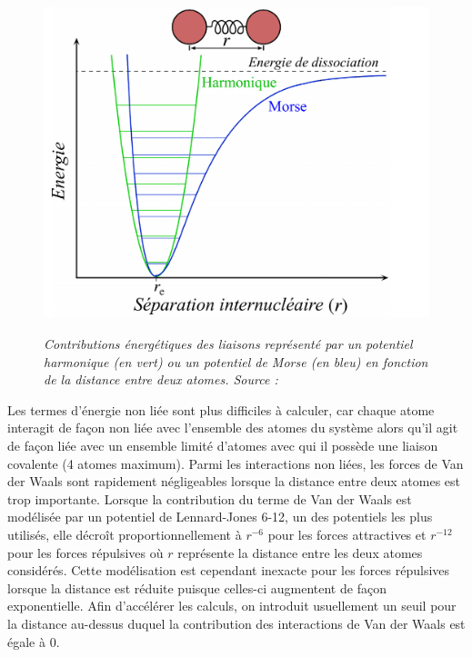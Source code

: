 \begin{figure}[htb]
  \centering
  {\includegraphics[width=0.65\linewidth]{./figures/ch1/harmonic_vs_morse_potential.pdf}}
    \caption[Contributions énergétiques des liaisons covalentes.]{\it Contributions énergétiques des liaisons représenté par un potentiel harmonique (en vert) ou un potentiel de Morse (en bleu) en fonction de la distance entre deux atomes. Source : \cite{assumed_graphical_2006}}
    \label{Fig:harmonic_morse_potential}
  \hspace{0.2cm}
\end{figure}

Les termes d'énergie non liée sont plus difficiles à calculer, car chaque atome interagit de façon non liée avec l'ensemble des atomes du système alors qu'il agit de façon liée avec un ensemble limité d'atomes avec qui il possède une liaison covalente (4 atomes maximum). 
Parmi les interactions non liées, les forces de Van der Waals sont rapidement négligeables lorsque la distance entre deux atomes est trop importante. Lorsque la contribution du terme de Van der Waals est modélisée par un potentiel de Lennard-Jones 6-12, un des potentiels les plus utilisés, elle décroît proportionnellement à $r^{-6}$ pour les forces attractives et $r^{-12}$ pour les forces répulsives où $r$ représente la distance entre les deux atomes considérés. Cette modélisation est cependant inexacte pour les forces répulsives lorsque la distance est réduite puisque celles-ci augmentent de façon exponentielle. Afin d'accélérer les calculs, on introduit usuellement un seuil pour la distance au-dessus duquel la contribution des interactions de Van der Waals est égale à 0.

